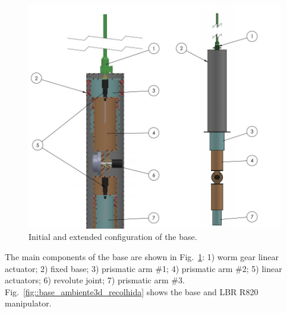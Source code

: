 \begin{figure}[h!]
\centering
	\includegraphics[width=\columnwidth]{figs/estudo/solid/baselbr.jpg} 
	\caption{Initial and extended configuration of the base.}
	\label{fig::baselbr}
\end{figure}



The main components of the base are shown in Fig.~\ref{fig::baselbr}: 1) worm
gear linear actuator; 2) fixed base; 3) prismatic arm \#1; 4) prismatic arm \#2;
5) linear actuators; 6) revolute joint; 7) prismatic arm \#3.
Fig.~\ref{fig::base_ambiente3d_recolhida} shows the base and LBR R820
manipulator.


